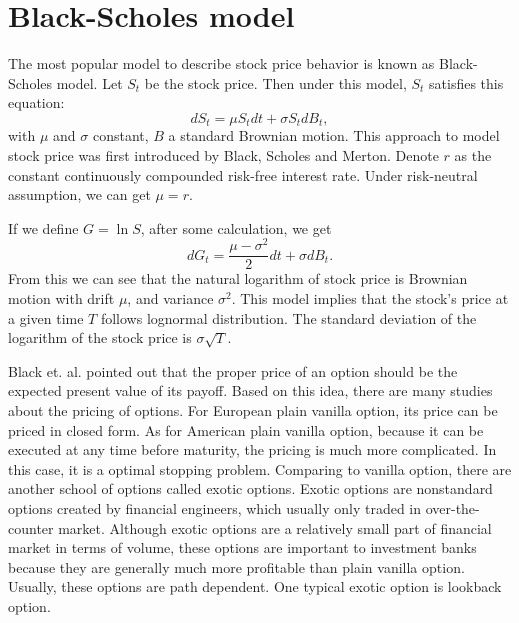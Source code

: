 \documentclass[11pt]{book}
\begin{document}
\section{Black-Scholes model}   
The most popular model to describe stock price behavior is known as Black-Scholes model. Let $S_t$ be the stock price. Then under this model, $S_t$ satisfies this equation: 
\begin{equation}\label{eq:1}
dS_t = \mu S_tdt + \sigma S_tdB_t, 
\end{equation}
with $\mu$ and $\sigma $ constant, $B$ a standard Brownian motion. This approach to model stock price was first introduced by Black, Scholes and Merton. Denote $r$ as the constant continuously compounded risk-free interest rate. Under risk-neutral assumption, we can get $\mu = r $. 

If we define $G = \ln S$, after some calculation, we get 
\begin{equation}\label{eq:2}
dG_t = \frac{\mu - \sigma ^2 }{2} dt + \sigma dB_t.
\end{equation}
From this we can see that the natural logarithm of stock price is Brownian motion with drift $\mu$, and variance $\sigma^2$. This model implies that the stock's price at a given time $T$ follows lognormal distribution. The standard deviation of the logarithm of the stock price is $\sigma \sqrt{T}$. 

Black et. al. \cite{Black:1973} pointed out that the proper price of an option should be the expected present value of its payoff. Based on this idea, there are many studies about the pricing of options. For European plain vanilla option, its price can be priced in closed form. As for American plain vanilla option, because it can be executed at any time before maturity, the pricing is much more complicated. In this case, it is a optimal stopping problem. Comparing to vanilla option, there are another school of options called exotic options. Exotic options are nonstandard options created by financial engineers, which usually only traded in over-the-counter market. Although exotic options are a relatively small part of financial market in terms of volume, these options are important to investment banks because they are generally much more profitable than plain vanilla option. Usually, these options are path dependent. One typical exotic option is lookback option.

\end{document}
